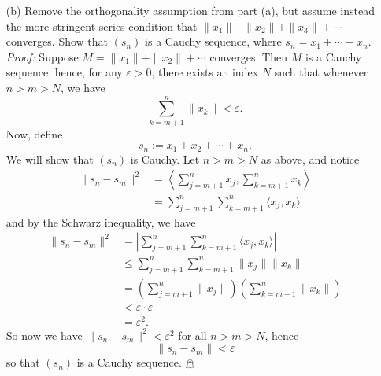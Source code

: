 \documentclass{article}
\begin{document}
\begin{itemize}
    \item[(b)] Remove the orthogonality assumption from part (a), but assume instead the more stringent series condition that $\|x_1\| + \|x_2\| + \|x_3\| + \cdots$ converges. Show that $(s_n)$ is a Cauchy sequence, where $s_n = x_1 + \cdots + x_n$.
    \newline\newline
    \textit{Proof:} Suppose $M = \|x_1\| + \|x_2\| + \cdots$ converges. Then $M$ is  a Cauchy sequence, hence, for any $\varepsilon > 0$, there exists an index $N$ such that whenever $n > m > N$, we have 
    \[\sum_{k = m+1}^n \|x_k\| < \varepsilon.\]
    Now, define 
    \[s_n := x_1 + x_2 + \cdots + x_n.\]
    We will show that $(s_n)$ is Cauchy. Let $n > m > N$ as above, and notice
    \begin{align*}
        \|s_n - s_m\|^2 &= \left\langle \sum_{j = m + 1}^{n} x_j, \sum_{k = m + 1}^{n} x_k  \right\rangle\\
        &= \sum_{j = m + 1}^{n} \sum_{k = m + 1}^n \langle x_j, x_k \rangle
    \end{align*}
    and by the Schwarz inequality, we have
    \begin{align*}
        \|s_n - s_m\|^2 &= \left|\sum_{j=m+1}^n\sum_{k=m+1}^n \langle x_j, x_k\rangle\right|\\
        &\leq \sum_{j = m+1}^n\sum_{k = m+1}^n \|x_j\|\|x_k\|\\
        &= \left(\sum_{j = m + 1}^n \|x_j\|\right)\left(\sum_{k = m + 1}^n \|x_k\|\right)\\
        &< \varepsilon \cdot \varepsilon\\
        &= \varepsilon^2.
    \end{align*}
    So now we have $\|s_n - s_m\|^2 < \varepsilon^2$ for all $n>m>N$, hence
    \[\|s_n - s_m\| < \varepsilon\]
    so that $(s_n)$ is a Cauchy sequence. \hfill $\mathghost$
    
\end{itemize}
\end{document}
